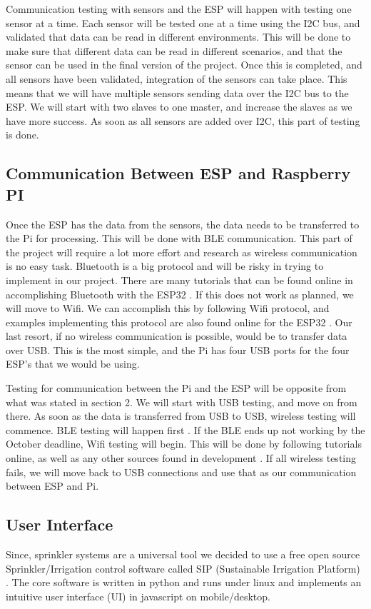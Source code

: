 \documentclass[letterpaper, 10 pt, conference]{ieeeconf}  %
\begin{document}
Communication testing with sensors and the ESP will happen with testing one sensor at a time. Each sensor will be tested one at a time using the I2C bus, and validated that data can be read in different environments. This will be done to make sure that different data can be read in different scenarios, and that the sensor can be used in the final version of the project. Once this is completed, and all sensors have been validated, integration of the sensors can take place. This means that we will have multiple sensors sending data over the I2C bus to the ESP. We will start with two slaves to one master, and increase the slaves as we have more success. As soon as all sensors are added over I2C, this part of testing is done. 

\subsection{Communication Between ESP and Raspberry PI}
Once the ESP has the data from the sensors, the data needs to be transferred to the Pi for processing. This will be done with BLE communication. This part of the project will require a lot more effort and research as wireless communication is no easy task. Bluetooth is a big protocol and will be risky in trying to implement in our project. There are many tutorials that can be found online in accomplishing Bluetooth with the ESP32 \cite{micropy}. If this does not work as planned, we will move to Wifi. We can accomplish this by following Wifi protocol, and examples implementing this protocol are also found online for the ESP32 \cite{rasServer}. Our last resort, if no wireless communication is possible, would be to transfer data over USB. This is the most simple, and the Pi has four USB ports for the four ESP's that we would be using.

Testing for communication between the Pi and the ESP will be opposite from what was stated in section 2. We will start with USB testing, and move on from there. As soon as the data is transferred from USB to USB, wireless testing will commence. BLE testing will happen first \cite{micropy}. If the BLE ends up not working by the October deadline, Wifi testing will begin. This will be done by following tutorials online, as well as any other sources found in development \cite{rasServer} . If all wireless testing fails, we will move back to USB connections and use that as our communication between ESP and Pi. 

\subsection{User Interface}
Since, sprinkler systems are a universal tool we decided to use a free open source Sprinkler/Irrigation control software called SIP (Sustainable Irrigation Platform) \cite{SIP}. The core software is written in python and runs under linux and implements an intuitive user interface (UI) in javascript on mobile/desktop. 
\end{document}
